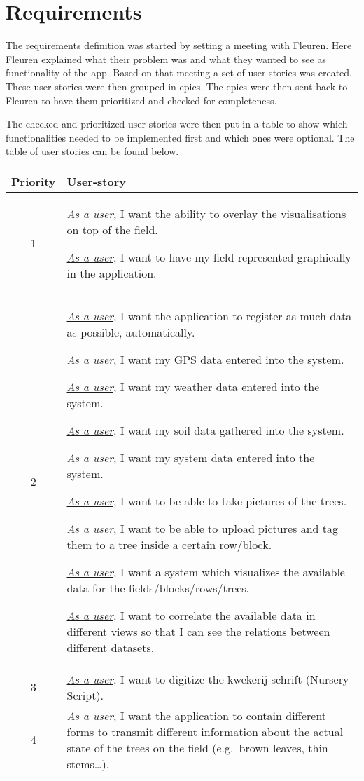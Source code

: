 \section{Requirements}
The requirements definition was started by setting a meeting with Fleuren. Here Fleuren explained what their problem was and what they wanted to see as functionality of the app. Based on that meeting a set of user stories was created. These user stories were then grouped in epics. The epics were then sent back to Fleuren to have them prioritized and checked for completeness.

The checked and prioritized user stories were then put in a table to show which functionalities needed to be implemented first and which ones were optional. The table of user stories can be found below.

\begin{tabularx}{\textwidth}{| c | X |}
	\hline
	Priority & User-story \\
	\hline
	1 & \underline{\textit{As a user}}, I want the ability to overlay the visualisations on top of the field. 
	
	\underline{\textit{As a user}}, I want to have my field represented graphically in the application. \\
	\hline
	2 & \underline{\textit{As a user}}, I want the application to register as much data as possible, automatically.
	
	\underline{\textit{As a user}}, I want my GPS data entered into the system.
	
	\underline{\textit{As a user}}, I want my weather data entered into the system.
	
	\underline{\textit{As a user}}, I want my soil data gathered into the system.
	
	\underline{\textit{As a user}}, I want my system data entered into the system.
	
	\underline{\textit{As a user}}, I want to be able to take pictures of the trees.
	
	\underline{\textit{As a user}}, I want to be able to upload pictures and tag them to a tree inside a certain row/block.
	
	\underline{\textit{As a user}}, I want a system which visualizes the available data for the fields/blocks/rows/trees.
	
	\underline{\textit{As a user}}, I want to correlate the available data in different views so that I can see the relations between different datasets. \\
	\hline
	3 & \underline{\textit{As a user}}, I want to digitize the kwekerij schrift (Nursery Script). \\
	\hline
	4 & \underline{\textit{As a user}}, I want the application to contain different forms to transmit different information about the actual state of the trees on the field (e.g.~brown leaves, thin stems\ldots{}).
	

\end{tabularx}
